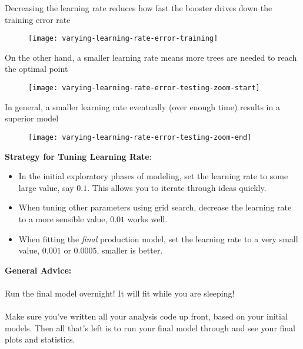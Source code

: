 %
\begin{frame}
Decreasing the learning rate reduces how fast the booster drives down the training error rate
  \begin{figure}
    \texttt{[image: varying-learning-rate-error-training]}
  \end{figure}
  
\end{frame}
%
\begin{frame}
On the other hand, a smaller learning rate means more trees are needed to reach the optimal point

  \begin{figure}
    \texttt{[image: varying-learning-rate-error-testing-zoom-start]}
  \end{figure}
  
\end{frame}
%
\begin{frame}
In general, a smaller learning rate eventually (over enough time) results in a superior model

  \begin{figure}
    \texttt{[image: varying-learning-rate-error-testing-zoom-end]}
  \end{figure}
  
\end{frame}
%
\begin{frame}
\textbf{Strategy for Tuning Learning Rate}:

\begin{itemize}
  \item In the initial exploratory phases of modeling, set the learning rate to some large value, say $0.1$.  This allows you to iterate through ideas quickly.
  \item When tuning other parameters using grid search, decrease the learning rate to a more sensible value, $0.01$ works well.
  \item When fitting the \textit{final} production model, set the learning rate to a very small value, $0.001$ or $0.0005$, smaller is better.
\end{itemize}

\end{frame}
%
\begin{frame}
\textbf{General Advice:}\\~\\

Run the final model overnight!  It will fit while you are sleeping!\\~\\

Make sure you've written all your analysis code up front, based on your initial models.  Then all that's left is to run your final model through and see your final plots and statistics.
\end{frame}

